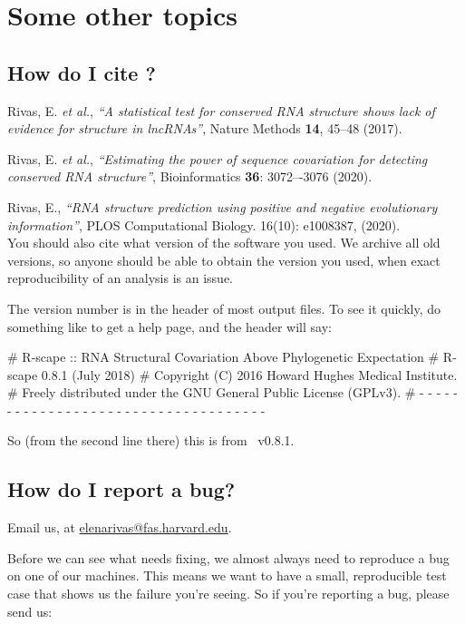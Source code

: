 
\section{Some other topics}
\label{section:more}
\setcounter{footnote}{0}

\subsection{How do I cite \rscape?}

\hspace{5mm}
Rivas, E. \textit{et al.}, \textit{``A statistical test for conserved RNA structure shows lack of evidence for structure in lncRNAs''},
Nature Methods {\bf 14}, 45–48 (2017).

Rivas, E. \textit{et al.}, \textit{``Estimating the power of sequence covariation for detecting conserved RNA structure''},
Bioinformatics {\bf 36}: 3072–-3076  (2020).

Rivas, E., \textit{``RNA structure prediction using positive and negative evolutionary information''},
PLOS Computational Biology. 16(10): e1008387, (2020).\\

You should also cite what version of the software you used. We archive
all old versions, so anyone should be able to obtain the version you
used, when exact reproducibility of an analysis is an issue.

The version number is in the header of most output files. To see it
quickly, do something like  to get a help page, and
the header will say:

\begin{sreoutput}
# R-scape :: RNA Structural Covariation Above Phylogenetic Expectation
# R-scape 0.8.1 (July 2018)
# Copyright (C) 2016 Howard Hughes Medical Institute.
# Freely distributed under the GNU General Public License (GPLv3).
# - - - - - - - - - - - - - - - - - - - - - - - - - - - - - - - - - - - -
\end{sreoutput}

So (from the second line there) this is from \rscape\ v0.8.1.

\subsection{How do I report a bug?}

Email us, at \url{elenarivas@fas.harvard.edu}.

Before we can see what needs fixing, we almost always need to
reproduce a bug on one of our machines. This means we want to have a
small, reproducible test case that shows us the failure you're seeing.
So if you're reporting a bug, please send us:

